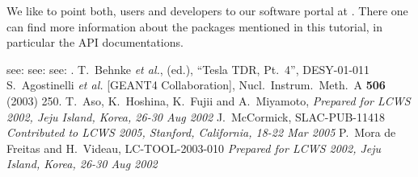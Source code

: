 We like to point both, users and developers to our software portal at
.
There one can find more information about the packages mentioned in this 
tutorial, in particular the API documentations. 

\begin{thebibliography}{99}
see: 
see: 
see: 
.
  T.~Behnke {\it et al.}, (ed.), ``Tesla TDR, Pt.~4'',
DESY-01-011
S.~Agostinelli {\it et al.}  [GEANT4 Collaboration],
Nucl.\ Instrum.\ Meth.\ A {\bf 506} (2003) 250.
T.~Aso, K.~Hoshina, K.~Fujii and A.~Miyamoto,
{\it Prepared for LCWS 2002, Jeju Island, Korea, 26-30 Aug 2002}
J.~McCormick,
SLAC-PUB-11418
{\it Contributed to LCWS 2005, Stanford, California, 18-22 Mar 2005}
  P.~Mora de Freitas and H.~Videau, LC-TOOL-2003-010
{\it Prepared for LCWS 2002, Jeju Island, Korea, 26-30 Aug 2002}

\end{thebibliography}
